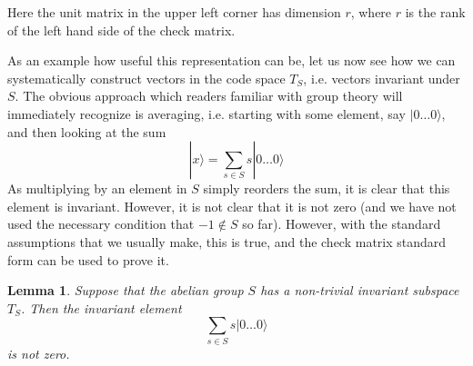 \documentclass[a4paper, draft]{article}
\theoremstyle{own}
\newtheorem{lem}[thm]{Lemma}
\theoremstyle{remark}
\begin{document}
Here the unit matrix in the upper left corner has dimension $r$, where $r$ is the rank of the left hand side of the check matrix. 

As an example how useful this representation can be, let us now see how we can systematically construct vectors in the code space $T_S$, i.e. vectors invariant under $S$. The obvious approach which readers familiar with group theory will immediately recognize is averaging, i.e. starting with some element, say $|0 \dots 0 \rangle$, and then looking at the sum
$$
|x \rangle = \sum_{s \in S} s |0 \dots 0 \rangle
$$
As multiplying by an element in $S$ simply reorders the sum, it is clear that this element is invariant. However, it is not clear that it is not zero (and we have not used the necessary condition that $-1 \notin S$ so far). However, with the standard assumptions that we usually make, this is true, and the check matrix standard form can be used to prove it.

\begin{lem}
Suppose that the abelian group $S$ has a non-trivial invariant subspace $T_S$. Then the invariant element
$$
\sum_{s \in S} s |0 \dots 0 \rangle
$$
is not zero.
\end{lem}
\end{document}
